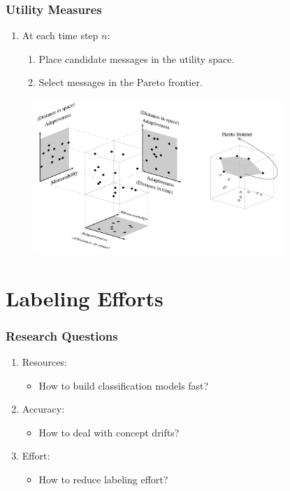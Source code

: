 \documentclass[14pt]{beamer}
\begin{document}
\begin{frame}\frametitle{Utility Measures}

\begin{enumerate}
\item At each time step $n$:
\begin{enumerate}
\item Place candidate messages in the utility space.
\item Select messages in the Pareto frontier.
\end{enumerate}
\end{enumerate}

\vspace{-0.1in}
\begin{figure}
\centering
\includegraphics[height=2.30in]{pareto}
\end{figure}

\end{frame}

\section{Labeling Efforts}
\begin{frame}\frametitle{Research Questions}

\begin{enumerate}
\item Resources:
\begin{itemize}
\item How to build classification models fast?
\end{itemize}

\item Accuracy:
\begin{itemize}
\item How to deal with concept drifts?
\end{itemize}

\item Effort:
\begin{itemize}
\item \alert{How to reduce labeling effort?}
\end{itemize}

\end{enumerate}

\end{frame}
\end{document}
